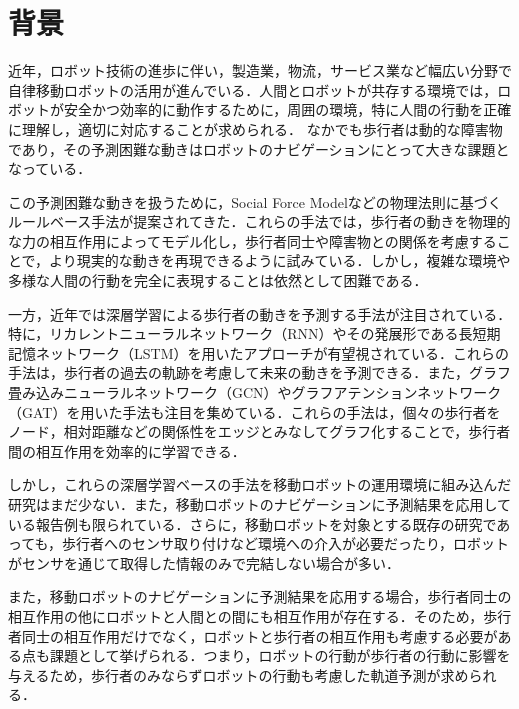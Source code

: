 
\section{背景}
近年，ロボット技術の進歩に伴い，製造業，物流，サービス業など幅広い分野で自律移動ロボットの活用が進んでいる．人間とロボットが共存する環境では，ロボットが安全かつ効率的に動作するために，周囲の環境，特に人間の行動を正確に理解し，適切に対応することが求められる．
なかでも歩行者は動的な障害物であり，その予測困難な動きはロボットのナビゲーションにとって大きな課題となっている\cite{kumahara-nav}．

この予測困難な動きを扱うために，Social Force Model\cite{s-force-model}などの物理法則に基づくルールベース手法が提案されてきた．これらの手法では，歩行者の動きを物理的な力の相互作用によってモデル化し，歩行者同士や障害物との関係を考慮することで，より現実的な動きを再現できるように試みている．しかし，複雑な環境や多様な人間の行動を完全に表現することは依然として困難である．

一方，近年では深層学習による歩行者の動きを予測する手法が注目されている．特に，リカレントニューラルネットワーク（RNN）\cite{rumelhart1986learning1,rumelhart1986learning2}やその発展形である長短期記憶ネットワーク（LSTM）\cite{hochreiter1997long}を用いたアプローチが有望視されている．これらの手法は，歩行者の過去の軌跡を考慮して未来の動きを予測できる．また，グラフ畳み込みニューラルネットワーク（GCN）\cite{kipf2016semi-gcn}やグラフアテンションネットワーク（GAT）\cite{velickovic2017graph-gat}を用いた手法も注目を集めている．これらの手法は，個々の歩行者をノード，相対距離などの関係性をエッジとみなしてグラフ化することで，歩行者間の相互作用を効率的に学習できる．

しかし，これらの深層学習ベースの手法を移動ロボットの運用環境に組み込んだ研究はまだ少ない．また，移動ロボットのナビゲーションに予測結果を応用している報告例も限られている．さらに，移動ロボットを対象とする既存の研究であっても，歩行者へのセンサ取り付けなど環境への介入が必要だったり，ロボットがセンサを通じて取得した情報のみで完結しない場合が多い．

また，移動ロボットのナビゲーションに予測結果を応用する場合，歩行者同士の相互作用の他にロボットと人間との間にも相互作用が存在する．そのため，歩行者同士の相互作用だけでなく，ロボットと歩行者の相互作用も考慮する必要がある点も課題として挙げられる．つまり，ロボットの行動が歩行者の行動に影響を与えるため，歩行者のみならずロボットの行動も考慮した軌道予測が求められる．


\newpage
